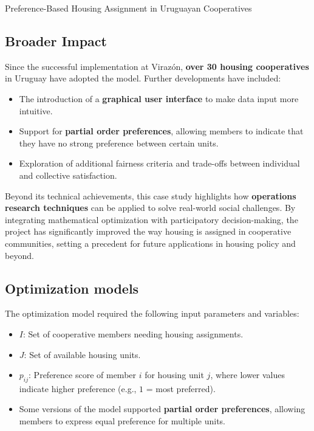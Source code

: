\begin{casestudybox}{Preference-Based Housing Assignment in Uruguayan Cooperatives}
\subsection*{Broader Impact}
Since the successful implementation at Virazón, \textbf{over 30 housing cooperatives} in Uruguay have adopted the model. Further developments have included:
\begin{itemize}
    \item The introduction of a \textbf{graphical user interface} to make data input more intuitive.
    \item Support for \textbf{partial order preferences}, allowing members to indicate that they have no strong preference between certain units.
    \item Exploration of additional fairness criteria and trade-offs between individual and collective satisfaction.
\end{itemize}

Beyond its technical achievements, this case study highlights how \textbf{operations research techniques} can be applied to solve real-world social challenges. By integrating mathematical optimization with participatory decision-making, the project has significantly improved the way housing is assigned in cooperative communities, setting a precedent for future applications in housing policy and beyond.

\subsection*{Optimization models}

The optimization model required the following input parameters and variables:

\begin{itemize}
    \item $I$: Set of cooperative members needing housing assignments.
    \item $J$: Set of available housing units.
\end{itemize}

\begin{itemize}
    \item $p_{ij}$: Preference score of member $i$ for housing unit $j$, where lower values indicate higher preference (e.g., $1$ = most preferred).
    \item Some versions of the model supported \textbf{partial order preferences}, allowing members to express equal preference for multiple units.
\end{itemize}


\end{casestudybox}

